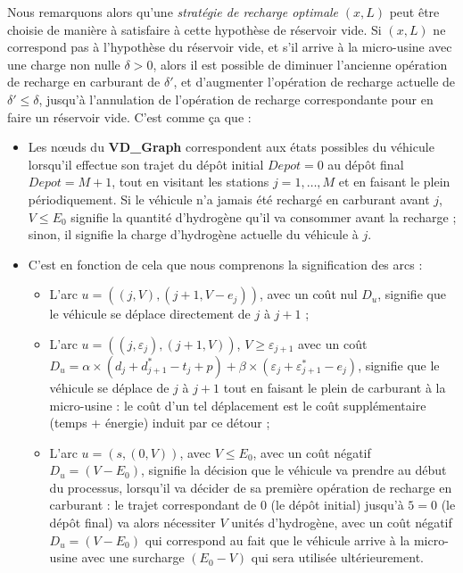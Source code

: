 Nous remarquons alors qu'une \textit{stratégie de recharge optimale} $(x, L)$ peut être choisie de manière à satisfaire à cette hypothèse de réservoir vide. Si $(x, L)$ ne correspond pas à l'hypothèse du réservoir vide, et s'il arrive à la micro-usine avec une charge non nulle $\delta > 0$, alors il est possible de diminuer l'ancienne opération de recharge en carburant de $\delta'$, et d'augmenter l'opération de recharge actuelle de $\delta' \leq \delta$, jusqu'à l'annulation de l'opération de recharge correspondante pour en faire un réservoir vide.  C'est comme ça que :
\begin{itemize}[label=$\square$]
	
	\item Les nœuds du \textbf{VD\_Graph} correspondent aux états possibles du véhicule lorsqu'il effectue son trajet du dépôt initial $Depot = 0 $ au dépôt final $Depot = M+1$, tout en visitant les stations $j = 1, \dots, M$ et en faisant le plein périodiquement. Si le véhicule n'a jamais été rechargé en carburant avant $j$, $V \leq E_0$ signifie la quantité d'hydrogène qu'il va consommer avant la recharge ; sinon, il signifie la charge d'hydrogène actuelle du véhicule à $j$. 
	\item C'est en fonction de cela que nous comprenons la signification des arcs :
	\begin{itemize}
		
		\item L'arc $u = ((j, V), (j+1, V- e_j))$, avec un coût nul $D_u$, signifie que le véhicule se déplace directement de $j$ à $j+1$ ; 
		\item L'arc $u = ((j, \varepsilon_j), (j+1, V))$, $V \geq \varepsilon_{j+1}$ avec un coût $D_u= \alpha \times (d_j + d^*_{j+1} - t_j +p) + \beta\times  (\varepsilon_j +\varepsilon^*_{j+1} - e_j)$, signifie que le véhicule se déplace de $j $ à $j+1$ tout en faisant le plein de carburant à la micro-usine : le coût d'un tel déplacement est le coût supplémentaire (temps + énergie) induit par ce détour ;
		\item L'arc $u = (s, (0, V))$, avec $V \leq E_0$, avec un coût négatif $D_u = (V- E_0)$, signifie la décision que le véhicule va prendre au début du processus, lorsqu'il va décider de sa première opération de recharge en carburant : le trajet correspondant de $0$ (le dépôt initial) jusqu'à $5=0$ (le dépôt final) va alors nécessiter $V$ unités d'hydrogène, avec un coût négatif $D_u = (V- E_0)$ qui correspond au fait que le véhicule arrive à la micro-usine avec une surcharge $(E_0- V)$ qui sera utilisée ultérieurement. 
	\end{itemize}
\end{itemize}

